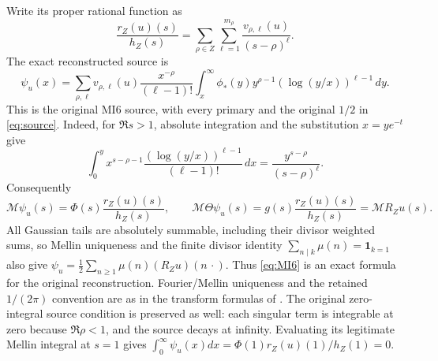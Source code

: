 \documentclass[11pt]{article}
\newcommand{\M}{\mathcal M}\newcommand{\G}{\mathsf G}
\begin{document}
Write its proper rational function as
\[
 \frac{r_Z(u)(s)}{h_Z(s)}=
 \sum_{\rho\in Z}\sum_{\ell=1}^{m_\rho}
                  \frac{v_{\rho,\ell}(u)}{(s-\rho)^\ell}.
 \tag{EG3}\label{eq:rational-source}
\]
The exact reconstructed source is
\[
 \psi_u(x)=\sum_{\rho,\ell}v_{\rho,\ell}(u)
 \frac{x^{-\rho}}{(\ell-1)!}
 \int_x^\infty\phi_*(y)y^{\rho-1}
                         (\log(y/x))^{\ell-1}\,dy.
 \tag{EG4}\label{eq:MI6}
\]
This is the original MI6 source, with every primary and the original
$1/2$ in \eqref{eq:source}. Indeed, for $\Re s>1$, absolute integration
and the substitution $x=ye^{-t}$ give
\[
 \int_0^y x^{s-\rho-1}\frac{(\log(y/x))^{\ell-1}}{(\ell-1)!}\,dx
       =\frac{y^{s-\rho}}{(s-\rho)^\ell}.
\]
Consequently
\[
 \M\psi_u(s)=\Phi(s)\frac{r_Z(u)(s)}{h_Z(s)},\qquad
 \M\Theta\psi_u(s)=g(s)\frac{r_Z(u)(s)}{h_Z(s)}=\M R_Zu(s).
 \tag{EG5}\label{eq:source-Mellin}
\]
All Gaussian tails are absolutely summable, including their divisor
weighted sums, so Mellin uniqueness and the finite divisor identity
$\sum_{n\mid k}\mu(n)=\mathbf1_{k=1}$ also give
$\psi_u=\frac12\sum_{n\ge1}\mu(n)(R_Zu)(n\,\cdot)$.
Thus \eqref{eq:MI6} is an exact formula for the original reconstruction.
Fourier/Mellin uniqueness and the retained $1/(2\pi)$ convention are
as in the transform formulas of \cite{DLMFTransforms}.
The original zero-integral source condition is preserved as well:
each singular term is integrable at zero because $\Re\rho<1$, and
the source decays at infinity. Evaluating its legitimate Mellin
integral at $s=1$ gives
$\int_0^\infty\psi_u(x)dx=\Phi(1)r_Z(u)(1)/h_Z(1)=0$.
\end{document}
